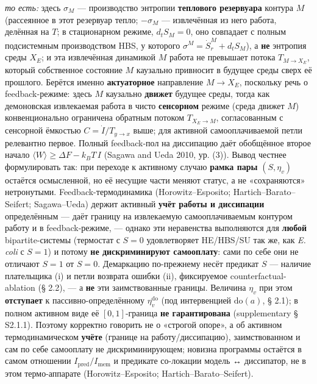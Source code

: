 \documentclass[pdflatex,sn-mathphys-ay]{sn-jnl}
\begin{document}
\emph{то есть:} здесь \(\sigma_{M}\) --- производство энтропии \textbf{теплового резервуара} контура \(M\) (рассеянное в этот резервуар тепло; \(-\sigma_{M}\) --- извлечённая из него работа, делённая на \(T\); в стационарном режиме, \(d_t S_M = 0\), оно совпадает с полным подсистемным производством HBS, у которого \(\sigma^M = \dot S_r^M + d_t S_M\)), а \textbf{не} энтропия среды \(X_E\); и эта извлечённая динамикой \(M\) работа не превышает потока \(T_{M \to X_E}\), который собственное состояние \(M\) каузально привносит в будущее среды сверх её прошлого. Берётся именно \textbf{актуаторное} направление \(M \to X_E\), поскольку речь о feedback-режиме: здесь \(M\) каузально \textbf{движет} будущее среды, тогда как демоновская извлекаемая работа в чисто \textbf{сенсорном} режиме (среда движет \(M\)) конвенционально ограничена обратным потоком \(T_{X_E \to M}\), согласованным с сенсорной ёмкостью \(C = \dot I / T_{y \to x}\) выше; для активной самооплачиваемой петли релевантно первое. Полный feedback-пол на диссипацию даёт обобщённое второе начало \(\langle W\rangle \ge \Delta F - k_B T\,I\) (Sagawa and Ueda 2010, ур. (3)). Вывод честнее формулировать так: при переходе к активному случаю \textbf{рамка пары} \((S, \eta_v)\) остаётся осмысленной, но её несущие части меняют статус, а не «сохраняются» нетронутыми. Feedback-термодинамика (Horowitz--Esposito; Hartich--Barato--Seifert; Sagawa--Ueda) держит активный \textbf{учёт работы и диссипации} определённым --- даёт границу на извлекаемую самооплачиваемым контуром работу и в feedback-режиме, --- однако эти неравенства выполняются для \textbf{любой} bipartite-системы (термостат с \(S = 0\) удовлетворяет HE/HBS/SU так же, как \emph{E. coli} с \(S = 1\)) и потому \textbf{не дискриминируют самооплату}: сами по себе они не отличают \(S = 1\) от \(S = 0\). Демаркацию по-прежнему несёт предикат \(S\) --- наличие плательщика (i) и петли возврата ошибки (ii), фиксируемое counterfactual-ablation (§ 2.2), --- а \textbf{не} эти заимствованные границы. Величина \(\eta_v\) при этом \textbf{отступает} к пассивно-определённому \(\eta_v^{\mathrm{do}}\) (под интервенцией \(\mathrm{do}(a)\), § 2.1); в полном активном виде её \([0, 1]\)-граница \textbf{не гарантирована} (supplementary § S2.1.1). Поэтому корректно говорить не о «строгой опоре», а об активном термодинамическом \textbf{учёте} (границе на работу/диссипацию), заимствованном и сам по себе самооплату не дискриминирующем; новизна программы остаётся в самом отношении \(I_{\text{pred}}/I_{\text{mem}}\) и предикате со-локации модель ↔ диссипатор, не в этом термо-аппарате (Horowitz--Esposito; Hartich--Barato--Seifert).
\end{document}
